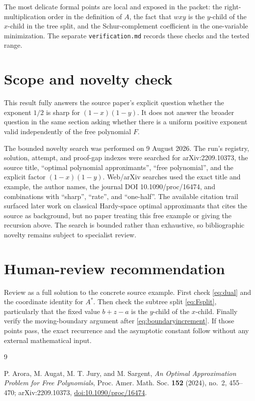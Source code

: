 \documentclass[11pt]{article}
\begin{document}
The most delicate formal points are local and exposed in the packet: the
right-multiplication order in the definition of $A$, the fact that $wxy$ is
the $y$-child of the $x$-child in the tree split, and the Schur-complement
coefficient in the one-variable minimization.  The separate
\texttt{verification.md} records these checks and the tested range.

\section{Scope and novelty check}

This result fully answers the source paper's explicit question whether the
exponent $1/2$ is sharp for $(1-x)(1-y)$.  It does not answer the broader
question in the same section asking whether there is a uniform positive
exponent valid independently of the free polynomial $F$.

The bounded novelty search was performed on 9 August 2026.  The run's
registry, solution, attempt, and proof-gap indexes were searched for
arXiv:2209.10373, the source title, ``optimal polynomial approximants'',
``free polynomial'', and the explicit factor $(1-x)(1-y)$.  Web/arXiv
searches used the exact title and example, the author names, the journal DOI
10.1090/proc/16474, and combinations with ``sharp'', ``rate'', and
``one-half''.  The available citation trail surfaced later work on classical
Hardy-space optimal approximants that cites the source as background, but no
paper treating this free example or giving the recursion above.  The search
is bounded rather than exhaustive, so bibliographic novelty remains subject
to specialist review.

\section{Human-review recommendation}

Review as a full solution to the concrete source example.  First check
\eqref{eq:dual} and the coordinate identity for $A^*$.  Then check the
subtree split \eqref{eq:Fsplit}, particularly that the fixed value $b+z-a$
is the $y$-child of the $x$-child.  Finally verify the moving-boundary
argument after \eqref{eq:boundaryincrement}.  If those points pass, the
exact recurrence and the asymptotic constant follow without any external
mathematical input.

\begin{thebibliography}{9}

P. Arora, M. Augat, M. T. Jury, and M. Sargent,
\emph{An Optimal Approximation Problem for Free Polynomials},
Proc. Amer. Math. Soc. \textbf{152} (2024), no.~2, 455--470;
arXiv:2209.10373,
\href{https://doi.org/10.1090/proc/16474}{doi:10.1090/proc/16474}.

\end{thebibliography}
\end{document}
